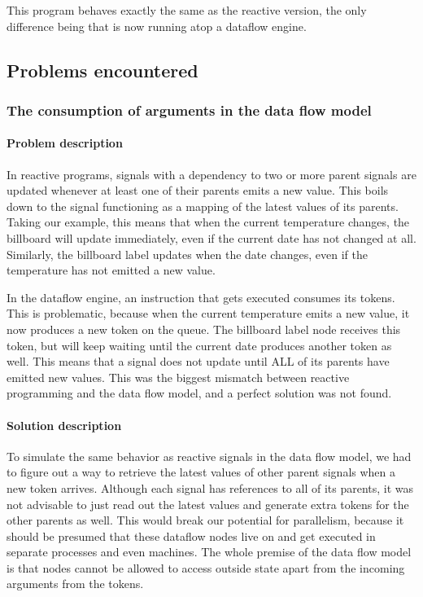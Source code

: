 This program behaves exactly the same as the reactive version, the only difference being that is now running atop a dataflow engine.

\subsection{Problems encountered}

\subsubsection{The consumption of arguments in the data flow model}

\paragraph{Problem description}

In reactive programs, signals with a dependency to two or more parent signals are updated whenever at least one of their parents emits a new value. This boils down to the signal functioning as a mapping of the latest values of its parents. Taking our example, this means that when the current temperature changes, the billboard will update immediately, even if the current date has not changed at all.
Similarly, the billboard label updates when the date changes, even if the temperature has not emitted a new value.

In the dataflow engine, an instruction that gets executed consumes its tokens. This is problematic, because when the current temperature emits a new value, it now produces a new token on the queue. 
The billboard label node receives this token, but will keep waiting until the current date produces another token as well. This means that a signal does not update until ALL of its parents have emitted new values.
This was the biggest mismatch between reactive programming and the data flow model, and a perfect solution was not found.

\paragraph{Solution description}

To simulate the same behavior as reactive signals in the data flow model, we had to figure out a way to retrieve the latest values of other parent signals when a new token arrives. 
Although each signal has references to all of its parents, it was not advisable to just read out the latest values and generate extra tokens for the other parents as well. 
This would break our potential for parallelism, because it should be presumed that these dataflow nodes live on and get executed in separate processes and even machines.
The whole premise of the data flow model is that nodes cannot be allowed to access outside state apart from the incoming arguments from the tokens.

